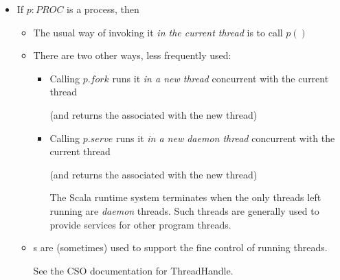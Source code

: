 \documentclass{concdistfoils}
\begin{document}
\begin{slide}
\begin{itemize}
\item If $p:PROC$ is a process, then 
\vfill
\begin{itemize}
\item The usual way of invoking it \textit{in the current thread} is to call $p()$ 


\vfill

\item There are two other ways, less frequently used:
\begin{itemize}
\item Calling $p.fork$ runs it \textit{in a new thread} concurrent with the current thread

(and returns the  associated with the new thread)

\vfill

\item Calling $p.serve$ runs it \textit{in a new \textit{daemon} thread} concurrent with the current thread

(and returns the  associated with the new thread)
\begin{note}
The Scala runtime system terminates when the only threads
left running are \textit{daemon} threads. Such threads
are generally used to provide services for other program threads.
\end{note}
\end{itemize}
\vfill
\item {}s are (sometimes) used to support the fine control of running threads.
\begin{note}
See the CSO documentation for ThreadHandle.
\end{note}
\end{itemize}
\end{itemize}
\end{slide}
\end{document}
